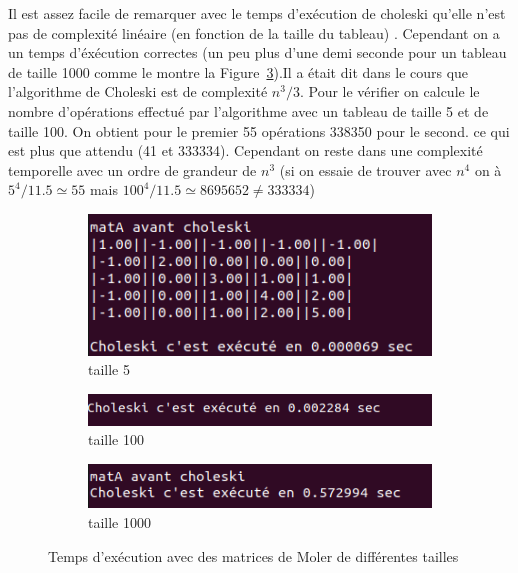 \documentclass[12pt]{article}
\begin{document}
Il est assez facile de remarquer avec le temps d'exécution de choleski qu'elle n'est pas de complexité linéaire (en fonction de la taille du tableau) . Cependant on a un temps d'éxécution correctes (un peu plus d'une demi seconde pour un tableau de taille 1000 comme le montre la Figure~\ref{Img_choleskiTemps1000}).Il a était dit dans le cours que l'algorithme de Choleski est de complexité $n^3/3$. Pour le vérifier on calcule le nombre d'opérations effectué par l'algorithme avec un tableau de taille 5 et de taille 100. On obtient pour le premier 55 opérations 338350 pour le second. ce qui est plus que attendu (41 et 333334). Cependant on reste dans une complexité temporelle avec un ordre de grandeur de $n^3$ (si on essaie de trouver avec $n^4$ on à $5^4/11.5 \simeq 55$ mais $100^4/11.5 \simeq 8695652 \neq 333334$)

\begin{figure}[H]
  \centering
  \begin{subfigure}{1\textwidth}
    \centering
    \includegraphics[width=0.5\linewidth]{img/choleskiTemps5}
    \caption{taille 5}\label{Img_choleskiTemps5}
  \end{subfigure}
  \begin{subfigure}{.8\textwidth}
    \centering
    \includegraphics[width=0.75\linewidth]{img/choleskiTemps100}
    \caption{taille 100}\label{Img_choleskiTemps100}
  \end{subfigure}
  \begin{subfigure}{.8\textwidth}
    \centering
    \includegraphics[width=0.75\linewidth]{img/choleskiTemps1000}
    \caption{taille 1000}\label{Img_choleskiTemps1000}
  \end{subfigure}
  \caption{Temps d'exécution avec des matrices de Moler de différentes tailles}
  \label{Fig_choleskiTemps}
\end{figure}
\end{document}
